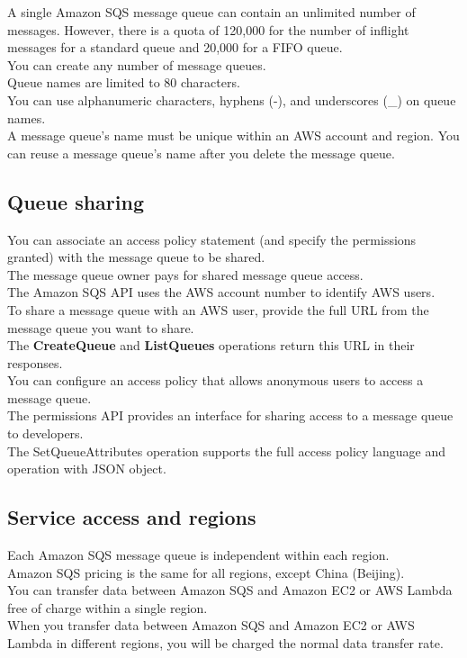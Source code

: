 \documentclass[12pt, letterpaper, twoside]{article}
\begin{document}
A single Amazon SQS message queue can contain an unlimited number of messages. However, there is a quota of 120,000 
for the number of inflight messages for a standard queue and 20,000 for a FIFO queue.\\

You can create any number of message queues.\\

Queue names are limited to 80 characters.\\
You can use alphanumeric characters, hyphens (-), and underscores (\_) on queue names.\\
A message queue's name must be unique within an AWS account and region. You can reuse a message queue's name after 
you delete the message queue.\\

\subsection{Queue sharing}
You can associate an access policy statement (and specify the permissions granted) with the message queue to be shared.\\
The message queue owner pays for shared message queue access.\\

The Amazon SQS API uses the AWS account number to identify AWS users.\\
To share a message queue with an AWS user, provide the full URL from the message queue you want to share.\\
The \textbf{CreateQueue} and \textbf{ListQueues} operations return this URL in their responses.\\

You can configure an access policy that allows anonymous users to access a message queue.\\

The permissions API provides an interface for sharing access to a message queue to developers.\\

The SetQueueAttributes operation supports the full access policy language and operation with JSON object.\\

\subsection{Service access and regions}
Each Amazon SQS message queue is independent within each region.\\
Amazon SQS pricing is the same for all regions, except China (Beijing).\\
You can transfer data between Amazon SQS and Amazon EC2 or AWS Lambda free of charge within a single region.\\
When you transfer data between Amazon SQS and Amazon EC2 or AWS Lambda in different regions, you will be charged the 
normal data transfer rate.\\
\end{document}
